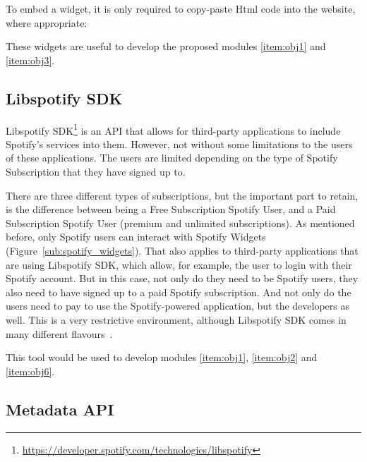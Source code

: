       To embed a widget, it is only required to copy-paste Html code into the website, where appropriate:

      

      These widgets are useful to develop the proposed modules \ref{item:obj1} and \ref{item:obj3}.


    \subsection{Libspotify SDK} %
    \label{sub:libspotify_sdk}

      Libspotify SDK\footnote{\url{https://developer.spotify.com/technologies/libspotify}} is an API that allows for third-party applications to include Spotify's services into them.
      However, not without some limitations to the users of these applications.
      The users are limited depending on the type of Spotify Subscription that they have signed up to.

      There are three different types of subscriptions, but the important part to retain, is the difference between being a Free Subscription Spotify User, and a Paid Subscription Spotify User (premium and unlimited subscriptions).
      As mentioned before, only Spotify users can interact with Spotify Widgets (Figure~\ref{sub:spotify_widgets}).
      That also applies to third-party applications that are using Libspotify SDK, which allow, for example, the user to login with their Spotify account.
      But in this case, not only do they need to be Spotify users, they also need to have signed up to a paid Spotify subscription.
      And not only do the users need to pay to use the Spotify-powered application, but the developers as well.
      This is a very restrictive environment, although Libspotify SDK comes in many different flavours~\cite{libspotifysdk}.

      This tool would be used to develop modules \ref{item:obj1}, \ref{item:obj2} and \ref{item:obj6}.
      



    \subsection{Metadata API} %
    \label{sub:metadata_api}

